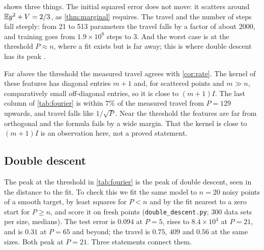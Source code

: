  shows three things. The initial squared error does not move:
it scatters around $\mathbb{E} y^2+V=2/3$, as \cref{thm:marginal} requires. The travel
and the number of steps fall steeply: from 21 to 513 parameters the travel falls
by a factor of about 2000, and training goes from $1.9\times10^{8}$ steps to 3.
And the worst case is at the threshold $P\approx n$, where a fit exists but is
far away; this is where double descent has its peak
\citep{belkin2019reconciling,nakkiran2020double}.

Far above the threshold the measured travel agrees with \cref{cor:rate}. The
kernel of these features has diagonal entries $m+1$ and, for scattered points
and $m\gg n$, comparatively small off-diagonal entries, so it is close to
$(m+1)I$. The last column of \cref{tab:fourier} is within $7\%$ of the measured
travel from $P=129$ upwards, and travel falls like $1/\sqrt P$. Near the
threshold the features are far from orthogonal and the formula fails by a wide
margin. That the kernel is close to $(m+1)I$ is an observation here, not a
proved statement.

\subsection{Double descent}
\label{sec:dd}

The peak at the threshold in \cref{tab:fourier} is the peak of double descent,
seen in the distance to the fit. To check this we fit the same model to
$n=20$ noisy points of a smooth target, by least squares for $P<n$ and by the
fit nearest to a zero start for $P\ge n$, and score it on fresh points
(\texttt{double\_descent.py}; 300 data sets per size, medians). The test error
is $0.094$ at $P=5$, rises to $8.4\times10^{4}$ at $P=21$, and is $0.31$ at
$P=65$ and beyond; the travel is $0.75$, $409$ and $0.56$ at the same sizes.
Both peak at $P=21$. Three statements connect them.


